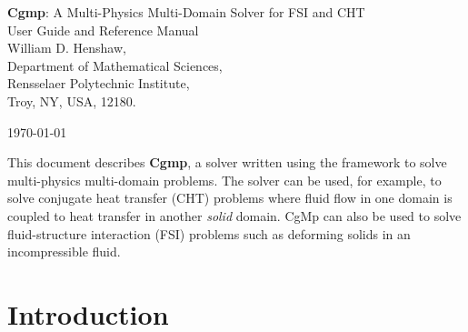 \documentclass[10pt]{article}
\begin{document}
\vspace{5\baselineskip}
\begin{flushleft}
{\Large
{\bf Cgmp}: A Multi-Physics Multi-Domain Solver for FSI and CHT \\
    User Guide and Reference Manual \\
}
\vspace{2\baselineskip}
William D. Henshaw,\\
Department of Mathematical Sciences, \\
Rensselaer Polytechnic Institute, \\
Troy, NY, USA, 12180.

\vspace{\baselineskip}
\today\\
\vspace{\baselineskip}

\vspace{4\baselineskip}


This document describes {\bf Cgmp}, a solver written using the \Overture framework 
to solve multi-physics multi-domain problems. The solver can be used, for example,
to solve conjugate heat transfer (CHT) problems where fluid flow in one domain is coupled to heat transfer
in another {\em solid} domain. CgMp can also be used to solve fluid-structure interaction (FSI) problems
such as deforming solids in an incompressible fluid.

\end{flushleft}

\clearpage
\tableofcontents
\listoffigures

\vfill\eject


\section{Introduction}
\end{document}
